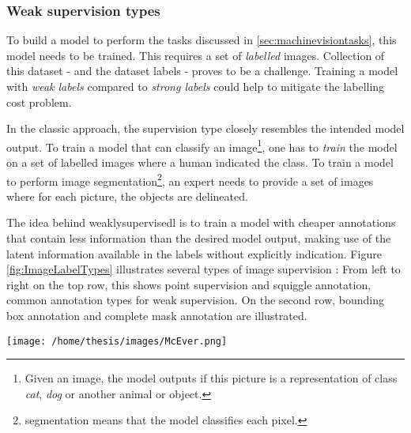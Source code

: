 \subsubsection{Weak supervision types\label{sec:weak_supervision}}
\par{
    To build a model to perform the tasks discussed in \ref{sec:machinevisiontasks}, this model needs to be trained.
    This requires a set of \textit{labelled} images.
    Collection of this dataset - and the dataset labels - proves to be a challenge. 
    Training a model with \textit{weak labels} compared to \textit{strong labels} could help to mitigate the labelling cost problem.
}
\par{
    In the classic approach, the supervision type closely resembles the intended model output.
    To train a model that can classify an image\footnote{Given an image, the model outputs if this picture is a representation of class \textit{cat}, \textit{dog} or another animal or object. }, 
    one has to \textit{train} the model on a set of labelled images where a human indicated the class.
    To train a model to perform image segmentation\footnote{segmentation means that the model classifies each pixel.}, an expert needs to provide a set of images where for each picture, the objects are delineated.  
}
\par{
    The idea behind \Gls{weaklysupervisedl} is to train a model with cheaper annotations that contain less information than the desired model output, 
    making use of the latent information available in the labels without explicitly indication.
    Figure \ref{fig:ImageLabelTypes} illustrates several types of image supervision : 
    From left to right on the top row, this shows point supervision and squiggle annotation, common annotation types for weak supervision.
    On the second row, bounding box annotation and complete mask annotation are illustrated.
}

\begin{SCfigure}[][htb]
    \centering
    \texttt{[image: /home/thesis/images/McEver.png]}
    \caption{Four different annotation types \cite{McEver2020}: 
    On the top left the picture is point level annotated. The points are inflated for visibility.
    On the top right, squiggle annotation is used.
    The bottom left shows bounding box supervion.
    While the bottom right image is fully annotated.
    An image level label would indicate that there are multiple instances of \textit{person} and \textit{bike} in the image.
    \label{fig:ImageLabelTypes}}
\end{SCfigure}

